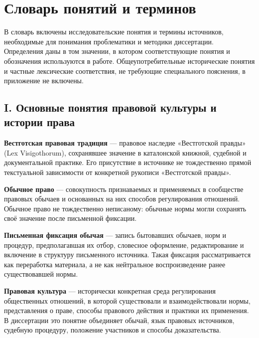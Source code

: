 
\chapter{Словарь понятий и терминов}

В словарь включены исследовательские понятия и термины источников, необходимые для понимания проблематики и методики диссертации. Определения даны в том значении, в котором соответствующие понятия и обозначения используются в работе. Общеупотребительные исторические понятия и частные лексические соответствия, не требующие специального пояснения, в приложение не включены.

\section{I. Основные понятия правовой культуры и истории права}

\noindent\textbf{Вестготская правовая традиция} --- правовое наследие «Вестготской правды» (Lex Visigothorum), сохранявшее значение в каталонской книжной, судебной и документальной практике. Его присутствие в источнике не тождественно прямой текстуальной зависимости от конкретной рукописи «Вестготской правды».
\par\medskip

\noindent\textbf{Обычное право} --- совокупность признаваемых и применяемых в сообществе правовых обычаев и основанных на них способов регулирования отношений. Обычное право не тождественно неписаному: обычные нормы могли сохранять своё значение после письменной фиксации.
\par\medskip

\noindent\textbf{Письменная фиксация обычая} --- запись бытовавших обычаев, норм и процедур, предполагавшая их отбор, словесное оформление, редактирование и включение в структуру письменного источника. Такая фиксация рассматривается как переработка материала, а не как нейтральное воспроизведение ранее существовавшей нормы.
\par\medskip

\noindent\textbf{Правовая культура} --- исторически конкретная среда регулирования общественных отношений, в которой существовали и взаимодействовали нормы, представления о праве, способы правового действия и практики их применения. В диссертации это понятие объединяет обычай, язык правовых источников, судебную процедуру, положение участников и способы доказательства.
\par\medskip

